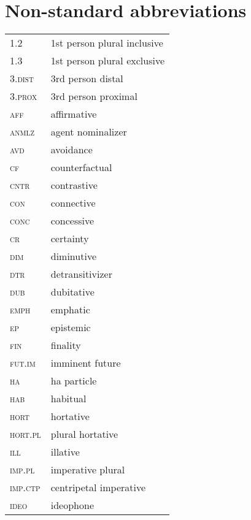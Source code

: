 \documentclass[output=paper,
modfonts,nonflat
]{langsci/langscibook}
\begin{document}
\section*{Non-standard abbreviations}

\begin{tabularx}{.5\textwidth}{lQ}
\textsc{1.2 } & 1st person plural inclusive \\
\textsc{1.3 } & 1st person plural exclusive \\
\textsc{3.dist } & 3rd person distal \\
\textsc{3.prox } & 3rd person proximal \\
\textsc{aff } & affirmative \\
\textsc{anmlz } & agent nominalizer \\
\textsc{avd } & avoidance \\
\textsc{cf } & counterfactual \\
\textsc{cntr } & contrastive \\
\textsc{con } & connective \\
\textsc{conc } & concessive \\
\textsc{cr } & certainty \\
\textsc{dim } & diminutive \\
\textsc{dtr } & detransitivizer \\
\textsc{dub } & dubitative \\
\textsc{emph } & emphatic \\
\textsc{ep } & epistemic \\ 
\textsc{fin } & finality \\
\textsc{fut.im } & imminent future \\
\textsc{ha } & ha particle \\
\textsc{hab } & habitual \\
\textsc{hort } & hortative \\
\textsc{hort.pl } & plural hortative \\
\textsc{ill } & illative \\
\textsc{imp.pl } & imperative plural \\
\textsc{imp.ctp } & centripetal imperative \\
\textsc{ideo } & ideophone \\
\end{tabularx}
\end{document}
